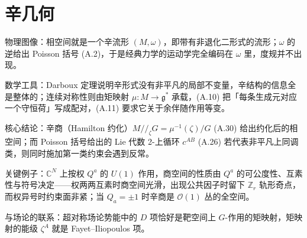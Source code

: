 
\section{辛几何} %

\begin{keytakeaways}
  \item 物理图像：相空间就是一个辛流形 $(M,\omega)$，即带有非退化二形式的流形；$\omega$ 的逆给出 Poisson 括号 (A.2)，于是经典力学的运动学完全编码在 $\omega$ 里，度规并不出现。
  \item 数学工具：Darboux 定理说明辛形式没有非平凡的局部不变量，辛结构的信息全是整体的；连续对称性则由矩映射 $\mu:M\to\mathfrak{g}^*$ 承载，(A.10) 把「每条生成元对应一个守恒荷」写成配对，(A.11) 要求它关于余伴随作用等变。
  \item 核心结论：辛商（Hamilton 约化）$M/\!/_\zeta G=\mu^{-1}(\zeta)/G$ (A.30) 给出约化后的相空间；而 Poisson 括号给出的 Lie 代数 2-上循环 $c^{AB}$ (A.26) 若代表非平凡上同调类，则同时施加第一类约束会遇到反常。
  \item 关键例子：$\mathbb{C}^N$ 上按权 $Q^a$ 的 $U(1)$ 作用，商空间的性质由 $Q^a$ 的可公度性、互素性与符号决定——权两两互素时商空间光滑，出现公共因子时留下 $\mathbb{Z}_r$ 轨形奇点，而权异号时约束面非紧；当 $Q_a=\pm1$ 时辛商是 $\mathcal{O}(1)$ 丛的全空间。
  \item 与场论的联系：超对称场论势能中的 $D$ 项恰好是靶空间上 $G$-作用的矩映射，矩映射的能级 $\zeta^A$ 就是 Fayet–Iliopoulos 项。
\end{keytakeaways}

